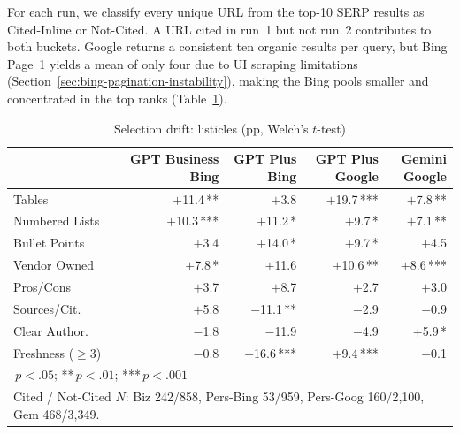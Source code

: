 For each run, we classify every unique URL from the top-10 SERP results as
Cited-Inline or Not-Cited. A URL cited in run~1 but not run~2 contributes
to both buckets. Google returns a consistent ten organic results per query,
but Bing Page~1 yields a mean of only four due to UI scraping limitations
(Section~\ref{sec:bing-pagination-instability}), making the Bing pools
smaller and concentrated in the top ranks (Table~\ref{tab:drift-listicles}).
\begin{table}[H]
\centering
\caption{Selection drift: listicles (pp, Welch's $t$-test)}
\label{tab:drift-listicles}
\small
\setlength{\tabcolsep}{8pt}
\begin{tabular}{lrrrr}
\toprule
 & \makecell{GPT Business\\Bing} & \makecell{GPT Plus\\Bing} & \makecell{GPT Plus\\Google} & \makecell{Gemini\\Google} \\
\midrule
Tables              & $+$11.4\,**\phantom{*}   & $+$3.8\phantom{\,***}    & $+$19.7\,***              & $+$7.8\,**\phantom{*}   \\
Numbered Lists      & $+$10.3\,***              & $+$11.2\,*\phantom{**}   & $+$9.7\,*\phantom{**}    & $+$7.1\,**\phantom{*}   \\
Bullet Points       & $+$3.4\phantom{\,***}     & $+$14.0\,*\phantom{**}   & $+$9.7\,*\phantom{**}    & $+$4.5\phantom{\,***}   \\
Vendor Owned        & $+$7.8\,*\phantom{**}     & $+$11.6\phantom{\,***}   & $+$10.6\,**\phantom{*}   & $+$8.6\,***             \\
Pros/Cons           & $+$3.7\phantom{\,***}     & $+$8.7\phantom{\,***}    & $+$2.7\phantom{\,***}    & $+$3.0\phantom{\,***}   \\
Sources/Cit.        & $+$5.8\phantom{\,***}     & $-$11.1\,**\phantom{*}   & $-$2.9\phantom{\,***}    & $-$0.9\phantom{\,***}   \\
Clear Author.       & $-$1.8\phantom{\,***}     & $-$11.9\phantom{\,***}   & $-$4.9\phantom{\,***}    & $+$5.9\,*\phantom{**}   \\
Freshness ($\geq$3) & $-$0.8\phantom{\,***}     & $+$16.6\,***              & $+$9.4\,***              & $-$0.1\phantom{\,***}   \\
\bottomrule
\multicolumn{5}{l}{\scriptsize *\,$p<.05$;\; **\,$p<.01$;\; ***\,$p<.001$} \\
\multicolumn{5}{l}{\scriptsize Cited / Not-Cited $N$: Biz 242/858, Pers-Bing 53/959, Pers-Goog 160/2{,}100, Gem 468/3{,}349.}
\end{tabular}
\end{table}

